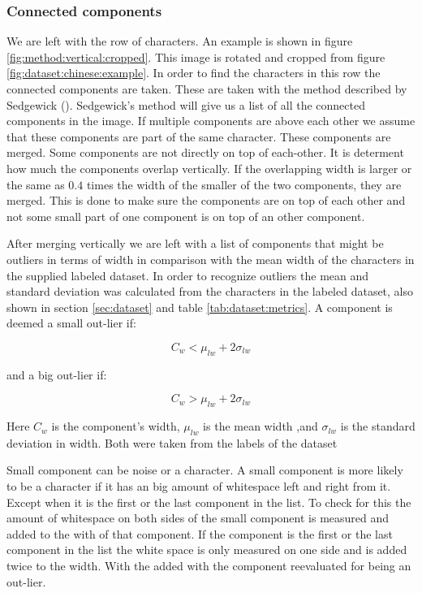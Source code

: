 \subsubsection{Connected components}

We are left with the row of characters. An example is shown in figure \ref{fig:method:vertical:cropped}. This image is rotated and cropped from figure \ref{fig:dataset:chinese:example}. In order to find the characters in this row the connected components are taken. These are taken with the method described by Sedgewick (\cite{Sedgewick}). Sedgewick's method will give us a list of all the connected components in the image. If multiple components are above each other we assume that these components are part of the same character. These components are merged. Some components are not directly on top of each-other. It is determent how much the components overlap vertically. If the overlapping width is larger or the same as $0.4$ times the width of the smaller of the two components, they are merged. This is done to make sure the components are on top of each other and not some small part of one component is on top of an other component.

After merging vertically we are left with a list of components that might be outliers in terms of width in comparison with the mean width of the characters in the supplied labeled dataset. In order to recognize outliers the mean and standard deviation was calculated from the characters in the labeled dataset, also shown in section \ref{sec:dataset} and table \ref{tab:dataset:metrics}. A component is deemed a small out-lier if:

\begin{equation}
C_w < \mu_{lw} + 2 \sigma_{lw} 
\end{equation}

\noindent and a big out-lier if:

\begin{equation}
C_w > \mu_{lw} + 2 \sigma_{lw} 
\end{equation}

Here $C_w$ is the component's width, $\mu_{lw}$ is the mean width ,and $\sigma_{lw}$ is the standard deviation in width. Both were taken from the labels of the dataset

Small component can be noise or a character. A small component is more likely to be a character if it has an big amount of whitespace left and right from it. Except when it is the first or the last component in the list. To check for this the amount of whitespace on both sides of the small component is measured and added to the with of that component. If the component is the first or the last component in the list the white space is only measured on one side and is added twice to the width. With the added with the component reevaluated for being an out-lier.

